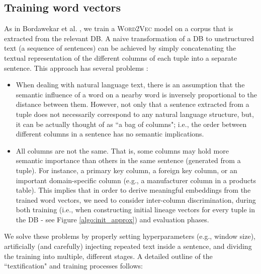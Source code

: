\subsection{Training word vectors} 
As in Bordawekar et al. \cite{DBLP:journals/corr/BordawekarS16}, we train a \textsc{Word2Vec} model \cite{rehurek_lrec} on a corpus that is extracted from the relevant DB.
A naive transformation of a DB to unstructured text (a sequence of sentences) can be achieved by simply concatenating the textual representation of the different columns of each tuple into a separate sentence. This approach has several problems \cite{DBLP:journals/corr/BordawekarS16}:
\begin{itemize}
    \item When dealing with natural language text, there is an assumption that the semantic influence of a word on a nearby word is inversely proportional to the distance between them. However, not only that a sentence extracted from a tuple does not necessarily correspond to any natural language structure, but, it can be actually thought of as ``a bag of columns"; i.e., the order between different columns in a sentence has no semantic implications.
    \item All columns are not the same. That is, some columns may hold more semantic importance than others in the same sentence (generated from a tuple). For instance, a primary key column, a foreign key column, or an important domain-specific column (e.g., a manufacturer column in a products table). This implies that in order to derive meaningful embeddings from the trained word vectors, we need to consider inter-column discrimination, during both training (i.e., when constructing initial lineage vectors for every tuple in the DB - see Figure \ref{algo:init_approx}) and evaluation phases.
\end{itemize}
We solve these problems by properly setting hyperparameters (e.g., window size), artificially (and carefully) injecting repeated text inside a sentence, and dividing the training into multiple, different stages. 
A detailed outline of the ``textification" and training processes follows:
